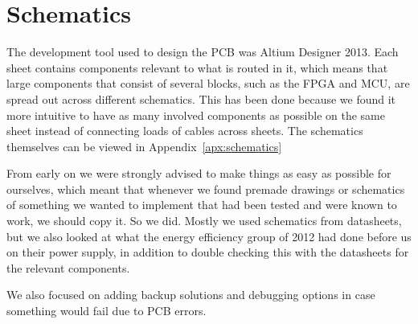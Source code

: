 \section{Schematics}

The development tool used to design the PCB was Altium Designer 2013. Each sheet contains components relevant to what is routed in it, which means that large components that consist of several blocks, such as the FPGA and MCU, are spread out across different schematics. This has  been done because we found it more intuitive to have as many involved components as possible on the same sheet instead of connecting loads of cables across sheets. The schematics themselves can be viewed in Appendix~\ref{apx:schematics} 

From early on we were strongly advised to make things as easy as possible for ourselves, which meant that whenever we found premade drawings or schematics of something we wanted to implement that had been tested and were known to work, we should copy it. So we did. Mostly we used schematics from datasheets, but we also looked at what the energy efficiency group of 2012 had done before us on their power supply, in addition to double checking this with the datasheets for the relevant components.

We also focused on adding backup solutions and debugging options in case something would fail due to PCB errors.

